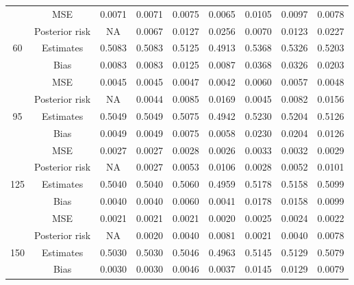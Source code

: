 \documentclass[a4paper,12pt]{report}
\begin{document}
\begin{minipage}{\linewidth}
{\begin{tabular}{|c|c|c|c|c|c|c|c|c|}
			&			MSE            &0.0071 &0.0071 &0.0075 &0.0065 &0.0105 &0.0097 &0.0078 \\
			&			Posterior risk   &NA &0.0067 &0.0127 &0.0256 &0.0070 &0.0123 &0.0227 \\ \hline
			60&			Estimates          &0.5083 &0.5083 &0.5125 &0.4913 &0.5368 &0.5326 &0.5203 \\
			&				Bias        &   0.0083 &0.0083 &0.0125 &0.0087 &0.0368 &0.0326 &0.0203 \\
			&				MSE          &  0.0045 &0.0045 &0.0047 &0.0042 &0.0060 &0.0057 &0.0048 \\
			&				Posterior risk&     NA &0.0044 &0.0085 &0.0169 &0.0045 &0.0082 &0.0156 \\ \hline
			95&				Estimates      &0.5049 &0.5049 &0.5075 &0.4942 &0.5230 &0.5204 &0.5126 \\
			&				Bias           &0.0049 &0.0049 &0.0075 &0.0058 &0.0230 &0.0204 &0.0126 \\
			&				MSE            &0.0027 &0.0027 &0.0028 &0.0026 &0.0033 &0.0032 &0.0029 \\
			&				Posterior risk   &NA &0.0027 &0.0053 &0.0106 &0.0028 &0.0052 &0.0101 \\ \hline
			125&			Estimates      &0.5040 &0.5040 &0.5060 &0.4959 &0.5178 &0.5158 &0.5099 \\
			&			Bias           &0.0040 &0.0040 &0.0060 &0.0041 &0.0178 &0.0158 &0.0099 \\
			&			MSE            &0.0021 &0.0021 &0.0021 &0.0020 &0.0025 &0.0024 &0.0022 \\
			&			Posterior risk   &NA &0.0020 &0.0040 &0.0081 &0.0021 &0.0040 &0.0078 \\ \hline
			150&			Estimates      &0.5030 &0.5030 &0.5046 &0.4963 &0.5145 &0.5129 &0.5079 \\
			&				Bias           &0.0030 &0.0030 &0.0046 &0.0037 &0.0145 &0.0129 &0.0079 \\

\end{tabular}}
\end{minipage}
\end{document}

